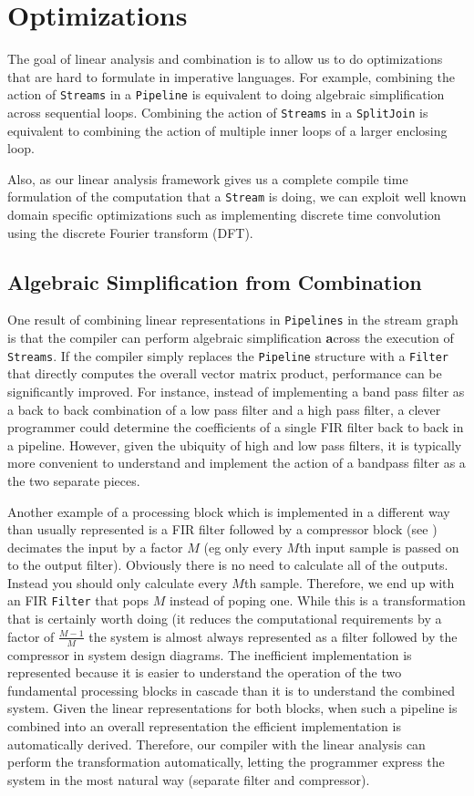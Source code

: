 \section{Optimizations}
The goal of linear analysis and combination is to allow us to do optimizations
that are hard to formulate in imperative languages. For example, combining the action
of {\tt Streams} in a {\tt Pipeline} is equivalent to doing algebraic simplification across
sequential loops. Combining the action of {\tt Streams} in a {\tt SplitJoin} is equivalent
to combining the action of multiple inner loops of a larger enclosing loop.

Also, as our linear analysis framework gives us a complete compile time formulation of the 
computation that a {\tt Stream} is doing, we can exploit well known domain specific optimizations
such as implementing discrete time convolution using the discrete Fourier transform (DFT). 
 


\subsection{Algebraic Simplification from Combination}
One result of combining linear representations in {\tt Pipelines} in the stream graph is that  
the compiler can perform algebraic simplification {\textbf across} the execution of {\tt Streams}. 
If the compiler simply replaces the {\tt Pipeline} structure with a {\tt Filter} that 
directly computes the overall vector matrix product, performance can be significantly improved.
For instance, instead of implementing a band pass filter as a back to back combination
of a low pass filter and a high pass filter, a clever programmer could determine the coefficients 
of a single FIR filter back to back in a pipeline. However, given the ubiquity of high and 
low pass filters, it is typically more convenient to understand and implement the action
of a bandpass filter as a the two separate pieces.

Another example of a processing block which is implemented in a different way than
usually represented is a FIR filter followed by a compressor block 
(see \cite{oppenheim-discrete}) decimates the input by a factor $M$ (eg only every $M$th 
input sample is passed on to the output filter). 
Obviously there is no need to calculate all of the outputs. 
Instead you should only calculate every $M$th sample.
Therefore, we end up with an FIR {\tt Filter} that pops $M$ instead of poping one. While
this is a transformation that is certainly worth doing (it reduces the computational
requirements by a factor of $\frac{M-1}{M}$ the system is almost always represented
as a filter followed by the compressor in system design diagrams. The inefficient
implementation is represented because it is easier to understand the operation of the
two fundamental processing blocks in cascade than it is to understand the combined system.
Given the linear representations for both blocks, when such a pipeline is combined into an
overall representation the efficient implementation is automatically derived. Therefore,
our compiler with the linear analysis can perform the transformation automatically, 
letting the programmer express the system in the most natural way (separate filter and compressor).

